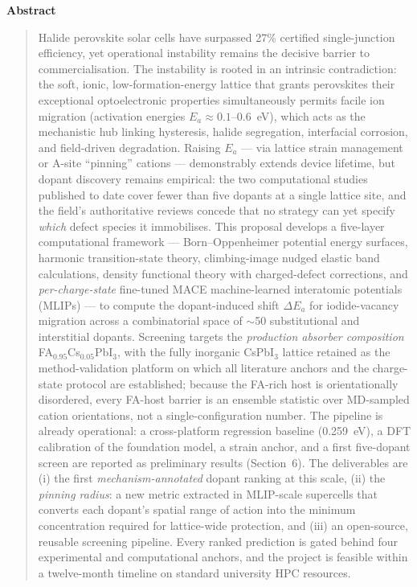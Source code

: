 \documentclass[11pt,a4paper]{article}
\begin{document}
\begin{center}\textbf{Abstract}\end{center}
\begin{quote}\small
Halide perovskite solar cells have surpassed 27\% certified single-junction efficiency,
yet operational instability remains the decisive barrier to commercialisation. The
instability is rooted in an intrinsic contradiction: the soft, ionic,
low-formation-energy lattice that grants perovskites their exceptional optoelectronic
properties simultaneously permits facile ion migration (activation energies
$E_a\approx0.1$--$0.6$~eV), which acts as the mechanistic hub linking hysteresis, halide
segregation, interfacial corrosion, and field-driven degradation. Raising $E_a$ ---
via lattice strain management or A-site ``pinning'' cations --- demonstrably extends
device lifetime, but dopant discovery remains empirical: the two computational studies
published to date cover fewer than five dopants at a single lattice site, and the
field's authoritative reviews concede that no strategy can yet specify \emph{which}
defect species it immobilises. This proposal develops a five-layer computational
framework --- Born--Oppenheimer potential energy surfaces, harmonic transition-state
theory, climbing-image nudged elastic band calculations, density functional theory with
charged-defect corrections, and \emph{per-charge-state} fine-tuned MACE machine-learned
interatomic potentials (MLIPs) --- to compute the dopant-induced shift $\Delta E_a$ for
iodide-vacancy migration across a combinatorial space of $\sim$50 substitutional and
interstitial dopants. Screening targets the \emph{production absorber composition}
FA$_{0.95}$Cs$_{0.05}$PbI$_3$, with the fully inorganic CsPbI$_3$ lattice retained as
the method-validation platform on which all literature anchors and the charge-state
protocol are established; because the FA-rich host is orientationally disordered,
every FA-host barrier is an ensemble statistic over MD-sampled cation orientations,
not a single-configuration number. The pipeline is already operational: a
cross-platform regression baseline (0.259~eV), a DFT calibration of the foundation
model, a strain anchor, and a first five-dopant screen are reported as preliminary
results (Section~6). The deliverables are (i) the first \emph{mechanism-annotated}
dopant ranking at this scale, (ii) the \emph{pinning radius}: a new metric extracted in
MLIP-scale supercells that converts each dopant's spatial range of action into the
minimum concentration required for lattice-wide protection, and (iii) an open-source,
reusable screening pipeline. Every ranked prediction is gated behind four experimental
and computational anchors, and the project is feasible within a twelve-month timeline
on standard university HPC resources.
\end{quote}
\end{document}
